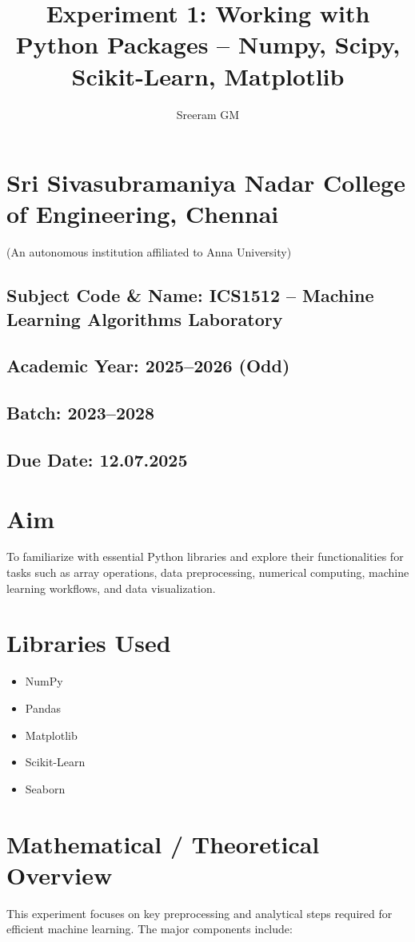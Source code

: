 \documentclass[12pt]{article}
\title{Experiment 1: Working with Python Packages – Numpy, Scipy, Scikit-Learn, Matplotlib}
\author{Sreeram GM}
\begin{document}
\maketitle

\section*{Sri Sivasubramaniya Nadar College of Engineering, Chennai}
(An autonomous institution affiliated to Anna University)

\subsection*{Subject Code \& Name: ICS1512 – Machine Learning Algorithms Laboratory}

\subsection*{Academic Year: 2025–2026 (Odd)}

\subsection*{Batch: 2023–2028}

\subsection*{Due Date: 12.07.2025}

\section{Aim}
To familiarize with essential Python libraries and explore their functionalities for tasks such as array operations, data preprocessing, numerical computing, machine learning workflows, and data visualization.

\section{Libraries Used}
\begin{itemize}
    \item NumPy
    \item Pandas
    \item Matplotlib
    \item Scikit-Learn
    \item Seaborn
\end{itemize}

\section{Mathematical / Theoretical Overview}
This experiment focuses on key preprocessing and analytical steps required for efficient machine learning. The major components include:
\end{document}
